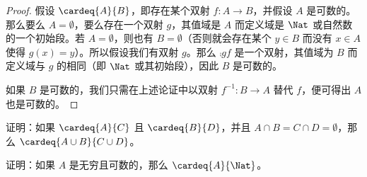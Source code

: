 \documentclass[../../../include/open-logic-section]{subfiles}
\begin{document}
\begin{proof}
假设 $\cardeq{A}{B}$，即存在某个双射 $f \colon A \to B$，并假设 $A$ 是可数的。
{
  那么要么 $A = \emptyset$，要么存在一个双射 $g$，其值域是 $A$ 而定义域是 $\Nat$ 或自然数的一个初始段。若 $A = \emptyset$，则也有 $B = \emptyset$（否则就会存在某个 $y \in B$ 而没有 $x \in A$ 使得 $g(x) = y$）。所以假设我们有双射 $g$。那么 $\comp{g}{f}$ 是一个双射，其值域为 $B$ 而定义域与 $g$ 的相同（即 $\Nat$ 或其初始段），因此 $B$ 是可数的。}

如果 $B$ 是可数的，我们只需在上述论证中以双射 $f^{-1}\colon B \to A$ 替代 $f$，便可得出 $A$ 也是可数的。
\end{proof}

\begin{prob}
证明：如果 $\cardeq{A}{C}$ 且 $\cardeq{B}{D}$，并且 $A \cap B = C \cap D = \emptyset$，那么 $\cardeq{A \cup B}{C \cup D}$。
\end{prob}

\begin{prob}
证明：如果 $A$ 是无穷且可数的，那么 $\cardeq{A}{\Nat}$。
\end{prob}
\end{document}
